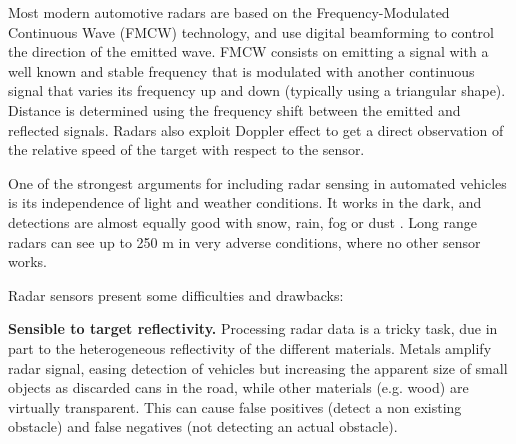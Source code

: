 Most modern automotive radars are based on the Frequency-Modulated Continuous
Wave (FMCW) technology, and use digital beamforming \cite{Hasch2015} to control
the direction of the emitted wave. 
FMCW consists on emitting a signal with a well known and stable frequency that
is modulated with another continuous signal that varies its frequency up and
down (typically using a triangular shape). Distance is
determined using the frequency shift between the emitted and reflected signals. 
Radars also exploit Doppler effect to get a direct observation of the relative
speed of the target with respect to the sensor. 



One of the strongest arguments for including radar sensing in automated 
vehicles is its independence of light and weather conditions. 
It works in the dark, and detections are almost equally good with snow, 
rain, fog or dust \cite{Reina2015}. Long range radars can see up to 250 m
in very adverse conditions, where no other sensor works.

Radar sensors present some difficulties and drawbacks:

    \textbf{Sensible to target reflectivity.} Processing radar data is a tricky
    task, due in part to the heterogeneous reflectivity of the different 
    materials. 
    Metals amplify radar signal, easing detection of vehicles but increasing
    the apparent size of small objects as discarded cans in the road, while 
    other materials (e.g. wood) are virtually transparent.
    This can cause false positives (detect a non existing obstacle) and false
    negatives (not detecting an actual obstacle).
    
